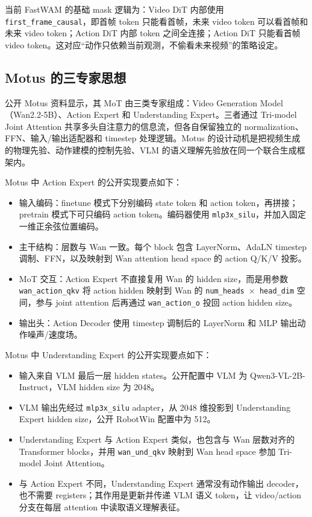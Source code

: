 \documentclass[UTF8,a4paper,11pt]{ctexart}
\begin{document}
当前 FastWAM 的基础 mask 逻辑为：Video DiT 内部使用 \texttt{first\_frame\_causal}，即首帧 token 只能看首帧，未来 video token 可以看首帧和未来 video token；Action DiT 内部 token 之间全连接；Action DiT 只能看首帧 video token。这对应“动作只依赖当前观测，不偷看未来视频”的策略设定。

\subsection{Motus 的三专家思想}

公开 Motus 资料显示，其 MoT 由三类专家组成：Video Generation Model（Wan2.2-5B）、Action Expert 和 Understanding Expert。三者通过 Tri-model Joint Attention 共享多头自注意力的信息流，但各自保留独立的 normalization、FFN、输入/输出适配器和 timestep 处理逻辑。Motus 的设计动机是把视频生成的物理先验、动作建模的控制先验、VLM 的语义理解先验放在同一个联合生成框架内。

Motus 中 Action Expert 的公开实现要点如下：
\begin{itemize}[leftmargin=1.6em]
  \item 输入编码：finetune 模式下分别编码 state token 和 action token，再拼接；pretrain 模式下可只编码 action token。编码器使用 \texttt{mlp3x\_silu}，并加入固定一维正余弦位置编码。
  \item 主干结构：层数与 Wan 一致。每个 block 包含 LayerNorm、AdaLN timestep 调制、FFN，以及映射到 Wan attention head space 的 action Q/K/V 投影。
  \item MoT 交互：Action Expert 不直接复用 Wan 的 hidden size，而是用参数 \texttt{wan\_action\_qkv} 将 action hidden 映射到 Wan 的 \texttt{num\_heads $\times$ head\_dim} 空间，参与 joint attention 后再通过 \texttt{wan\_action\_o} 投回 action hidden size。
  \item 输出头：Action Decoder 使用 timestep 调制后的 LayerNorm 和 MLP 输出动作噪声/速度场。
\end{itemize}

Motus 中 Understanding Expert 的公开实现要点如下：
\begin{itemize}[leftmargin=1.6em]
  \item 输入来自 VLM 最后一层 hidden states。公开配置中 VLM 为 Qwen3-VL-2B-Instruct，VLM hidden size 为 2048。
  \item VLM 输出先经过 \texttt{mlp3x\_silu} adapter，从 2048 维投影到 Understanding Expert hidden size，公开 RobotWin 配置中为 512。
  \item Understanding Expert 与 Action Expert 类似，也包含与 Wan 层数对齐的 Transformer blocks，并用 \texttt{wan\_und\_qkv} 映射到 Wan head space 参加 Tri-model Joint Attention。
  \item 与 Action Expert 不同，Understanding Expert 通常没有动作输出 decoder，也不需要 registers；其作用是更新并传递 VLM 语义 token，让 video/action 分支在每层 attention 中读取语义理解表征。
\end{itemize}
\end{document}
